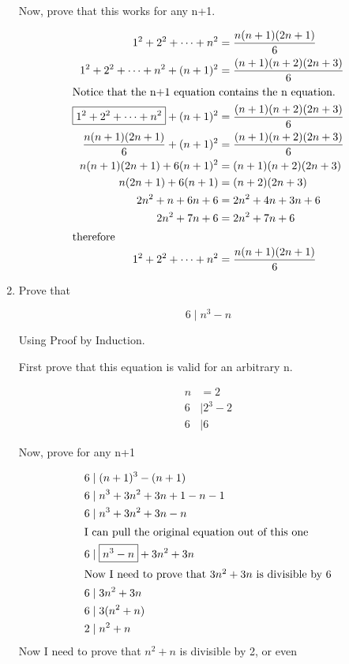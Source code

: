 \documentclass[11pt]{article}
\begin{document}
\begin{enumerate}
Now, prove that this works for any n+1.

\begin{align*}
1^2 + 2^2 + \cdots + n^2 & = \frac{n(n+1)(2n+1)}{6} \\
1^2 + 2^2 + \cdots + n^2 + (n+1)^ 2 & = \frac{(n+1)(n+2)(2n+3)}{6} \\
\intertext{Notice that the n+1 equation contains the n equation.}
\boxed{1^2 + 2^2 + \cdots + n^2 } + (n+1)^ 2 & = \frac{(n+1)(n+2)(2n+3)}{6} \\
\frac{n(n+1)(2n+1)}{6} + (n+1)^2 & = \frac{(n+1)(n+2)(2n+3)}{6} \\
n(n+1)(2n+1) + 6(n+1)^2 & = (n+1)(n+2)(2n+3) \\
n(2n+1) + 6(n+1) & = (n+2)(2n+3) \\
2n^2 + n + 6n + 6 & = 2n^2 + 4n + 3n + 6 \\
2n^2 + 7n + 6 &= 2n^2 + 7n + 6 \\
\intertext{therefore}
1^2 + 2^2 + \cdots + n^2 & = \frac{n(n+1)(2n+1)}{6}
\end{align*}

\item %
Prove that

\[
6 \mid n^3 - n
\]

Using Proof by Induction.

First prove that this equation is valid for an arbitrary n.

\begin{align*}
n & = 2 \\
6 & \mid 2^3 - 2 \\
6 & \mid 6
\end{align*}

Now, prove for any n+1

\begin{align*}
6 & \mid (n+1)^3 - (n+1) \\
6 & \mid n^3 + 3n^2 + 3n + 1 - n - 1 \\
6 & \mid n^3 + 3n^2 + 3n - n \\
\intertext{I can pull the original equation out of this one}
6 & \mid \boxed{n^3 - n} + 3n^2 + 3n \\
\intertext{Now I need to prove that $3n^2 + 3n$ is divisible by 6}
6 & \mid 3n^2 + 3n \\
6 & \mid 3(n^2 + n) \\
2 & \mid n^2 + n \\ 
\end{align*}
Now I need to prove that $n^2 + n$ is divisible by 2, or even 


\end{enumerate}
\end{document}
